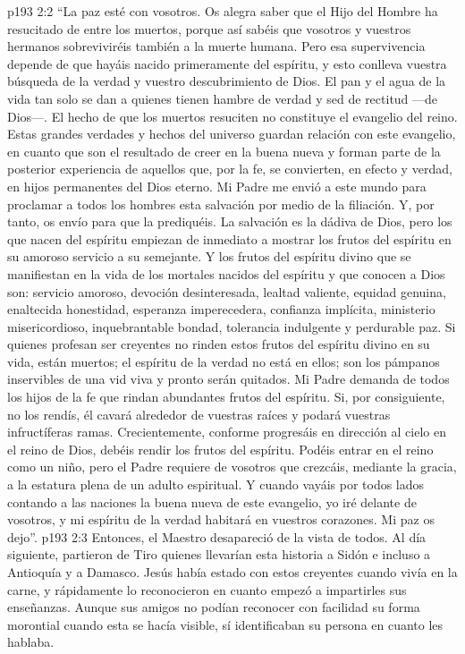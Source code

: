 \vs p193 2:2 \pc “La paz esté con vosotros. Os alegra saber que el Hijo del Hombre ha resucitado de entre los muertos, porque así sabéis que vosotros y vuestros hermanos sobreviviréis también a la muerte humana. Pero esa supervivencia depende de que hayáis nacido primeramente del espíritu, y esto conlleva vuestra búsqueda de la verdad y vuestro descubrimiento de Dios. El pan y el agua de la vida tan solo se dan a quienes tienen hambre de verdad y sed de rectitud ---de Dios---. El hecho de que los muertos resuciten no constituye el evangelio del reino. Estas grandes verdades y hechos del universo guardan relación con este evangelio, en cuanto que son el resultado de creer en la buena nueva y forman parte de la posterior experiencia de aquellos que, por la fe, se convierten, en efecto y verdad, en hijos permanentes del Dios eterno. Mi Padre me envió a este mundo para proclamar a todos los hombres esta salvación por medio de la filiación. Y, por tanto, os envío para que la prediquéis. La salvación es la dádiva de Dios, pero los que nacen del espíritu empiezan de inmediato a mostrar los frutos del espíritu en su amoroso servicio a su semejante. Y los frutos del espíritu divino que se manifiestan en la vida de los mortales nacidos del espíritu y que conocen a Dios son: servicio amoroso, devoción desinteresada, lealtad valiente, equidad genuina, enaltecida honestidad, esperanza imperecedera, confianza implícita, ministerio misericordioso, inquebrantable bondad, tolerancia indulgente y perdurable paz. Si quienes profesan ser creyentes no rinden estos frutos del espíritu divino en su vida, están muertos; el espíritu de la verdad no está en ellos; son los pámpanos inservibles de una vid viva y pronto serán quitados. Mi Padre demanda de todos los hijos de la fe que rindan abundantes frutos del espíritu. Si, por consiguiente, no los rendís, él cavará alrededor de vuestras raíces y podará vuestras infructíferas ramas. Crecientemente, conforme progresáis en dirección al cielo en el reino de Dios, debéis rendir los frutos del espíritu. Podéis entrar en el reino como un niño, pero el Padre requiere de vosotros que crezcáis, mediante la gracia, a la estatura plena de un adulto espiritual. Y cuando vayáis por todos lados contando a las naciones la buena nueva de este evangelio, yo iré delante de vosotros, y mi espíritu de la verdad habitará en vuestros corazones. Mi paz os dejo”.
\vs p193 2:3 \pc Entonces, el Maestro desapareció de la vista de todos. Al día siguiente, partieron de Tiro quienes llevarían esta historia a Sidón e incluso a Antioquía y a Damasco. Jesús había estado con estos creyentes cuando vivía en la carne, y rápidamente lo reconocieron en cuanto empezó a impartirles sus enseñanzas. Aunque sus amigos no podían reconocer con facilidad su forma morontial cuando esta se hacía visible, sí identificaban su persona en cuanto les hablaba.
